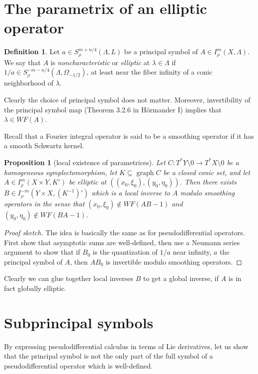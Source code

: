 \documentclass[reqno,12pt,letterpaper]{amsart}
\newcommand{\dfn}[1]{\emph{#1}\index{#1}}
\newtheorem{proposition}[theorem]{Proposition}
\theoremstyle{definition}
\newtheorem{definition}[theorem]{Definition}
\begin{document}
\section{The parametrix of an elliptic operator}
\begin{definition}
Let $a \in S^{m + n/4}_\rho(\Lambda, L)$ be a principal symbol of $A \in I^m_\rho(X, \Lambda)$.
We say that $A$ is \dfn{noncharacteristic} or \dfn{elliptic} at $\lambda \in \Lambda$ if $1/a \in S^{-m-n/4}_\rho(\Lambda, \Omega_{-1/2})$, at least near the fiber infinity of a conic neighborhood of $\lambda$.
\end{definition}

Clearly the choice of principal symbol does not matter.
Moreover, invertibility of the principal symbol map (Theorem 3.2.6 in H\"ormander I) implies that $\lambda \in WF(A)$.

Recall that a Fourier integral operator is said to be a smoothing operator if it has a smooth Schwartz kernel.

\begin{proposition}[local existence of parametrices]
Let $C: T^*Y \setminus 0 \to T^*X \setminus 0$ be a homogeneous symplectomorphism, let $K \subseteq \operatorname{graph} C$ be a closed conic set, and let $A \in I^m_\rho(X \times Y, K')$ be elliptic at $((x_0, \xi_0), (y_0, \eta_0))$.
Then there exists $B \in I^{-m}_\rho(Y \times X, (K^{-1})')$ which is a local inverse to $A$ modulo smoothing operators in the sense that $(x_0, \xi_0) \notin WF(AB - 1)$ and $(y_0, \eta_0) \notin WF(BA - 1)$.
\end{proposition}
\begin{proof}[Proof sketch]
The idea is basically the same as for pseudodifferential operators.
First show that asymptotic sums are well-defined, then use a Neumann series argument to show that if $B_0$ is the quantization of $1/a$ near infinity, $a$ the principal symbol of $A$, then $AB_0$ is invertible modulo smoothing operators.
\end{proof}

Clearly we can glue together local inverses $B$ to get a global inverse, if $A$ is in fact globally elliptic.

\section{Subprincipal symbols}
By expressing pseudodifferential calculus in terms of Lie derivatives, let us show that the principal symbol is not the only part of the full symbol of a pseudodifferential operator which is well-defined.
\end{document}
